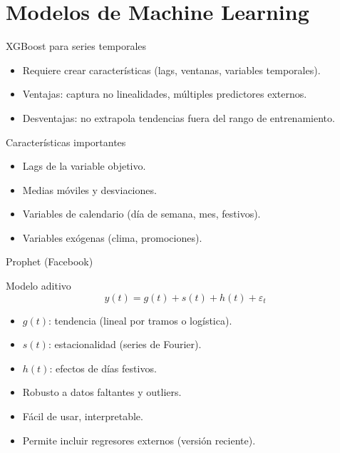 \documentclass[aspectratio=169, 10pt, xcolor=table]{beamer}
\begin{document}
\section{Modelos de Machine Learning}

\begin{frame}{XGBoost para series temporales}
    \begin{itemize}
        \item Requiere crear características (lags, ventanas, variables temporales).
        \item Ventajas: captura no linealidades, múltiples predictores externos.
        \item Desventajas: no extrapola tendencias fuera del rango de entrenamiento.
    \end{itemize}
    \vspace{0.3cm}
    \begin{block}{Características importantes}
        \begin{itemize}
            \item Lags de la variable objetivo.
            \item Medias móviles y desviaciones.
            \item Variables de calendario (día de semana, mes, festivos).
            \item Variables exógenas (clima, promociones).
        \end{itemize}
    \end{block}
\end{frame}

\begin{frame}{Prophet (Facebook)}
    \begin{block}{Modelo aditivo}
        \[
        y(t) = g(t) + s(t) + h(t) + \varepsilon_t
        \]
        \begin{itemize}
            \item $g(t)$: tendencia (lineal por tramos o logística).
            \item $s(t)$: estacionalidad (series de Fourier).
            \item $h(t)$: efectos de días festivos.
        \end{itemize}
    \end{block}
    \begin{itemize}
        \item Robusto a datos faltantes y outliers.
        \item Fácil de usar, interpretable.
        \item Permite incluir regresores externos (versión reciente).
    \end{itemize}
\end{frame}
\end{document}
